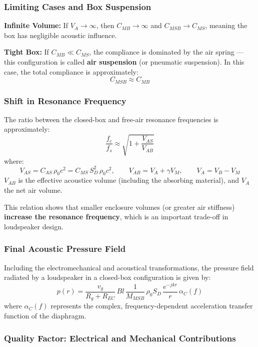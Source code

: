 \subsubsection{Limiting Cases and Box Suspension}

\textbf{Infinite Volume:}
If \( V_A \to \infty \), then \( C_{MB} \to \infty \) and \( C_{MSB} \to C_{MS} \), meaning the box has negligible acoustic influence.

\textbf{Tight Box:}
If \( C_{MB} \ll C_{MS} \), the compliance is dominated by the air spring — this configuration is called \textbf{air suspension} (or pneumatic suspension).  
In this case, the total compliance is approximately:
\[
C_{MSB} \approx C_{MB}
\]

\subsubsection{Shift in Resonance Frequency}

The ratio between the closed-box and free-air resonance frequencies is approximately:
\[
\frac{f_c}{f_s} \approx \sqrt{1 + \frac{V_{AS}}{V_{AB}}}
\]
where:
\[
V_{AS} = C_{AS} \, \rho_0 c^2 = C_{MS} \, S_D^2 \, \rho_0 c^2
,\qquad 
V_{AB} = V_A + \gamma V_M
,\qquad V_A = V_B - V_M
\]
$V_{AB}$ is the effective acoustice volume (including the absorbing material), and $V_A$ the net air volume.

This relation shows that smaller enclosure volumes (or greater air stiffness) \textbf{increase the resonance frequency}, which is an important trade-off in loudspeaker design.

\subsubsection{Final Acoustic Pressure Field}

Including the electromechanical and acoustical transformations, the pressure field radiated by a loudspeaker in a closed-box configuration is given by:
\[
p(r) = \frac{v_g}{R_g + R_{EC}} \, B l \, \frac{1}{M_{MSB}} \, \rho_0 S_D \, \frac{e^{-jkr}}{r} \, \alpha_C(f)
\]
where \( \alpha_C(f) \) represents the complex, frequency-dependent acceleration transfer function of the diaphragm.



\subsubsection{Quality Factor: Electrical and Mechanical Contributions}

